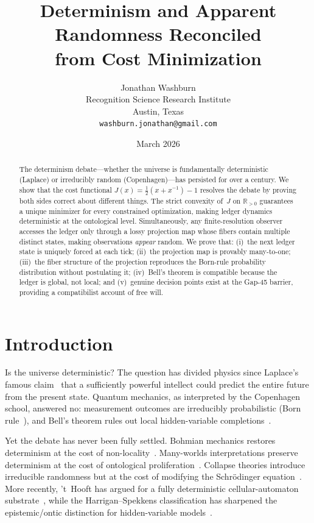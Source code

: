 \documentclass[12pt,a4paper]{article}
\title{Determinism and Apparent Randomness Reconciled\\
from Cost Minimization}
\author{Jonathan Washburn\\
Recognition Science Research Institute\\
Austin, Texas\\
\texttt{washburn.jonathan@gmail.com}}
\date{March 2026}
\theoremstyle{definition}
\theoremstyle{remark}
\begin{document}
\maketitle

\begin{abstract}
The determinism debate---whether the universe is fundamentally deterministic
(Laplace) or irreducibly random (Copenhagen)---has persisted for over a
century.  We show that the cost functional
$J(x) = \tfrac{1}{2}(x + x^{-1}) - 1$ resolves the debate by proving
both sides correct about different things.  The strict convexity of~$J$
on $\mathbb{R}_{>0}$ guarantees a unique minimizer for every constrained
optimization, making ledger dynamics deterministic at the ontological level.
Simultaneously, any finite-resolution observer accesses the ledger only
through a lossy projection map whose fibers contain multiple distinct
states, making observations \emph{appear} random.  We prove that:
(i)~the next ledger state is uniquely forced at each tick;
(ii)~the projection map is provably many-to-one;
(iii)~the fiber structure of the projection reproduces the Born-rule
probability distribution without postulating it;
(iv)~Bell's theorem is compatible because the ledger is global, not local;
and (v)~genuine decision points exist at the Gap-45 barrier, providing a
compatibilist account of free will.
\end{abstract}

\section{Introduction}

Is the universe deterministic?  The question has divided physics since
Laplace's famous claim~\cite{Laplace1814} that a sufficiently powerful
intellect could predict the entire future from the present state.
Quantum mechanics, as interpreted by the Copenhagen school, answered
no: measurement outcomes are irreducibly probabilistic
(Born rule~\cite{Born1926}), and Bell's theorem rules out local
hidden-variable completions~\cite{Bell1964}.

Yet the debate has never been fully settled.  Bohmian mechanics restores
determinism at the cost of non-locality~\cite{Bohm1952}.  Many-worlds
interpretations preserve determinism at the cost of ontological
proliferation~\cite{Everett1957}.  Collapse theories introduce
irreducible randomness but at the cost of modifying the
Schr\"odinger equation~\cite{GRW1986}.  More recently, 't~Hooft
has argued for a fully deterministic cellular-automaton
substrate~\cite{tHooft2016}, while the Harrigan--Spekkens classification
has sharpened the epistemic/ontic distinction for
hidden-variable models~\cite{Harrigan2010}.
\end{document}
